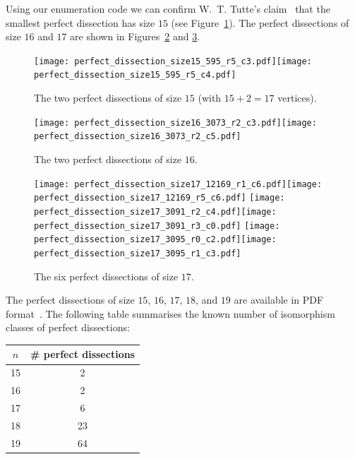 \documentclass[12pt,amstags,fleqn]{article}
\theoremstyle{plain}
\theoremstyle{definition}
\theoremstyle{definition}
\begin{document}
Using our enumeration code we can confirm W.~T. Tutte's
claim~\cite{MR0003040,MR0027521}
that the smallest perfect dissection has size $15$ (see
Figure~\ref{figPerfect15}).
The perfect dissections of size $16$ and $17$ are shown in
Figures~\ref{figPerfect16} and \ref{figPerfect17}.
%
\begin{figure}[htbp]
\begin{center}
\texttt{[image: perfect\_dissection\_size15\_595\_r5\_c3.pdf]}\texttt{[image: perfect\_dissection\_size15\_595\_r5\_c4.pdf]}
\end{center}
\caption{The two perfect dissections of size $15$ (with $15+2 = 17$
vertices).}
\label{figPerfect15}
\end{figure}
%
\begin{figure}[htbp]
\begin{center}
\texttt{[image: perfect\_dissection\_size16\_3073\_r2\_c3.pdf]}\texttt{[image: perfect\_dissection\_size16\_3073\_r2\_c5.pdf]}
\end{center}
\caption{The two perfect dissections of size $16$.}
\label{figPerfect16}
\end{figure}
%
\begin{figure}[htbp]
\begin{center}
\texttt{[image: perfect\_dissection\_size17\_12169\_r1\_c6.pdf]}\texttt{[image: perfect\_dissection\_size17\_12169\_r5\_c6.pdf]}
\texttt{[image: perfect\_dissection\_size17\_3091\_r2\_c4.pdf]}\texttt{[image: perfect\_dissection\_size17\_3091\_r3\_c0.pdf]}
\texttt{[image: perfect\_dissection\_size17\_3095\_r0\_c2.pdf]}\texttt{[image: perfect\_dissection\_size17\_3095\_r1\_c3.pdf]}
\end{center}
\caption{The six perfect dissections of size $17$.}
\label{figPerfect17}
\end{figure}
%
The perfect dissections of size $15$,
$16$,
$17$,
$18$, and
$19$ are available in PDF format~\cite{dissections}.
The following table summarises the known number of isomorphism classes
of perfect dissections:

\begin{center}
\begin{tabular}{|c|c|}
\hline $n$ & \# perfect dissections \\
\hline
\hline 15 & 2 \\
\hline 16 & 2 \\
\hline 17 & 6 \\
\hline 18 & 23 \\
\hline 19 & 64 \\
\hline
\end{tabular}
\end{center}
\end{document}
